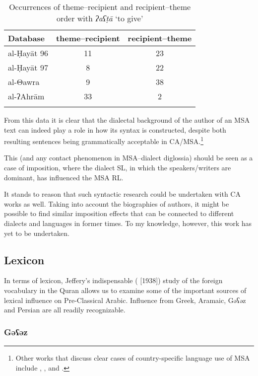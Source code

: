 \documentclass[output=paper]{langsci/langscibook}
\begin{document}
\begin{table}
\begin{tabular}{lcc}
\lsptoprule
{Database} & {theme–recipient} & {recipient–theme}\\\midrule
al-Ḥayāt 96 & 11 & 23\\
al-Ḥayāt 97 & \hphantom{1}8 & 22\\
al-Θawra    &  \hphantom{1}9 & 38\\
al-ʔAhrām   & 33 &  \hphantom{1}2\\
\lspbottomrule
\end{tabular}
\caption{\label{bkm:Ref533762457}\label{tab:vanputten:2}Occurrences of theme–recipient and recipient–theme order with \textit{ʔaʕṭā} ‘to give’}
\end{table}

From this data it is clear that the dialectal background of the author of an MSA text can indeed play a role in how its syntax is constructed, despite both resulting sentences being grammatically acceptable in CA/MSA.\footnote{Other works that discuss clear cases of country-specific language use of MSA include \citet{Ibrahim2009}, \citet{Parkinson2003},  \citet{Parkinson2007} and \citet{ParkinsonIbrahim1999}.}

This (and any contact phenomenon in MSA–dialect diglossia) should be seen as a case of imposition, where the dialect SL, in which the speakers/writers are dominant, has influenced the MSA RL. 

It stands to reason that such syntactic research could be undertaken with CA works as well. Taking into account the biographies of authors, it might be possible to find similar imposition effects that can be connected to different dialects and languages in former times. To my knowledge, however, this work has yet to be undertaken.

\subsection{Lexicon}

In terms of lexicon, Jeffery’s indispensable (\citeyear{Jeffrey2007} [1938]) study of the foreign vocabulary in the Quran allows us to examine some of the important sources of lexical influence on Pre-Classical Arabic. Influence from Greek, Aramaic, Gəʕəz and Persian are all readily recognizable. 

\subsubsection{\label{bkm:Ref13224677}Gəʕəz}
\end{document}
